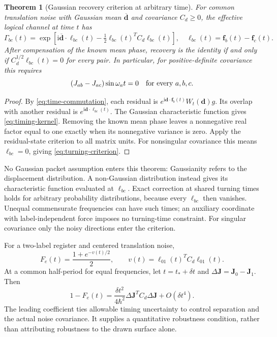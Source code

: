 \documentclass[aip,adv,reprint,onecolumn,amsmath,amssymb]{revtex4-2}
\newcommand{\ii}{\mathrm i}
\newtheorem{theorem}{Theorem}[section]
\begin{document}
\begin{theorem}[Gaussian recovery criterion at arbitrary time]
For common translation noise with Gaussian mean $\overline{\bm d}$ and covariance $C_d\ge0$, the effective logical channel at time $t$ has
\begin{equation}
 \Gamma_{bc}(t)=\exp\left[\ii\overline{\bm d}\cdot\bm\ell_{bc}(t)-\tfrac12\bm\ell_{bc}(t)^TC_d\bm\ell_{bc}(t)\right],
 \quad \bm\ell_{bc}(t)=\bm f_b(t)-\bm f_c(t).
 \label{eq:timing-kernel}
\end{equation}
After compensation of the known mean phase, recovery is the identity if and only if $C_d^{1/2}\bm\ell_{bc}(t)=0$ for every pair. In particular, for positive-definite covariance this requires
\begin{equation}
 (J_{ab}-J_{ac})\sin\omega_at=0\quad\hbox{for every }a,b,c.
 \label{eq:turning-criterion}
\end{equation}
\end{theorem}
\begin{proof}
By \eqref{eq:time-commutation}, each residual is $e^{\ii\bm d\cdot\bm f_b(t)}W_t(\bm d)g$. Its overlap with another residual is $e^{\ii\bm d\cdot\bm\ell_{bc}(t)}$. The Gaussian characteristic function gives \eqref{eq:timing-kernel}. Removing the known mean phase leaves a nonnegative real factor equal to one exactly when its nonnegative variance is zero. Apply the residual-state criterion to all matrix units. For nonsingular covariance this means $\bm\ell_{bc}=0$, giving \eqref{eq:turning-criterion}.
\end{proof}
No Gaussian packet assumption enters this theorem: Gaussianity refers to the displacement distribution. A non-Gaussian distribution instead gives its characteristic function evaluated at $\bm\ell_{bc}$. Exact correction at shared turning times holds for arbitrary probability distributions, because every $\bm\ell_{bc}$ then vanishes. Unequal commensurate frequencies can have such times; an auxiliary coordinate with label-independent force imposes no turning-time constraint. For singular covariance only the noisy directions enter the criterion.

For a two-label register and centered translation noise,
\begin{equation}
 F_e(t)=\frac{1+e^{-v(t)/2}}2,\qquad
 v(t)=\bm\ell_{01}(t)^TC_d\bm\ell_{01}(t).
 \label{eq:timing-fidelity}
\end{equation}
At a common half-period for equal frequencies, let $t=t_*+\delta t$ and $\Delta\bm J=\bm J_0-\bm J_1$. Then
\begin{equation}
 1-F_e(t)=\frac{\delta t^2}{4\hbar^2}\Delta\bm J^TC_d\Delta\bm J+O(\delta t^4).
 \label{eq:timing-expansion}
\end{equation}
The leading coefficient ties allowable timing uncertainty to control separation and the actual noise covariance. It supplies a quantitative robustness condition, rather than attributing robustness to the drawn surface alone.
\end{document}
